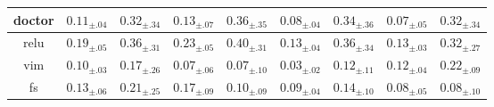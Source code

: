 \begin{table}
{\begin{tabular}{c|c|c|c|c|c|c|c|c|c}
		\multicolumn{2}{c|}{\gls{doctor}} & $0.11_{\pm .04}$ & $0.32_{\pm .34}$ & $0.13_{\pm .07}$ & $0.36_{\pm .35}$ & $0.08_{\pm .04}$ & $0.34_{\pm .36}$ & $0.07_{\pm .05}$ & $0.32_{\pm .34}$ \\\hline
		\multicolumn{2}{c|}{\gls{relu}} & $0.19_{\pm .05}$ & $0.36_{\pm .31}$ & $0.23_{\pm .05}$ & $0.40_{\pm .31}$ & $0.13_{\pm .04}$ & $0.36_{\pm .34}$ & $0.13_{\pm .03}$ & $0.32_{\pm .27}$ \\\hline
		\multicolumn{2}{c|}{\gls{vim}} & $0.10_{\pm .03}$ & $0.17_{\pm .26}$ & $0.07_{\pm .06}$ & $0.07_{\pm .10}$ & $0.03_{\pm .02}$ & $0.12_{\pm .11}$ & $0.12_{\pm .04}$ & $0.22_{\pm .09}$ \\\hline
		\multicolumn{2}{c|}{\gls{fs}} & $0.13_{\pm .06}$ & $0.21_{\pm .25}$ & $0.17_{\pm .09}$ & $0.10_{\pm .09}$ & $0.09_{\pm .04}$ & $0.14_{\pm .10}$ & $0.08_{\pm .05}$ & $0.08_{\pm .10}$ \\\hline
	\end{tabular}%
	}
\end{table}
